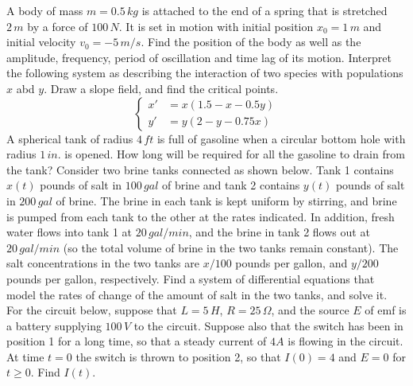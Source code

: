 \documentclass[12pt]{article}
\begin{document}
{\problem[5pts] A body of mass $m=0.5\, kg$ is attached to the end of a spring
that is stretched $2\, m$ by a force of $100\, N$.  It is set in motion with
initial position $x_0=1\, m$ and initial velocity $v_0=-5\, m/s$.  Find the
position of the body as well as the amplitude, frequency, period of oscillation
and time lag of its motion.}
{\problem[5pts] Interpret the following system as describing the interaction of two species with populations $x$ abd $y$.  Draw a slope field, and find the critical points.}
\begin{equation*}
\begin{cases} x' &= x(1.5-x-0.5y) \\ y' &= y(2-y-0.75x) \end{cases}
\end{equation*}
{\problem[5pts] A spherical tank of radius $4\, ft$ is full of gasoline when a circular bottom hole with radius $1\, in.$ is opened.  How long will be required for all the gasoline to drain from the tank?}
{\problem[10pts]\label{p:tanks} Consider two brine tanks connected as shown below.  Tank 1
contains $x(t)$ pounds of salt in $100\, gal$ of brine and tank 2 contains
$y(t)$ pounds of salt in $200\, gal$ of brine.  The brine in each tank is kept
uniform by stirring, and brine is pumped from each tank to the other at the
rates indicated.  In addition, fresh water flows into tank 1 at $20\, gal/min$,
and the brine in tank 2 flows out at $20\, gal/min$ (so the total volume of
brine in the two tanks remain constant).  The salt concentrations in the two
tanks are $x/100$ pounds per gallon, and $y/200$ pounds per gallon,
respectively.  Find a system of differential equations that model the rates of
change of the amount of salt in the two tanks, and solve it.}
{\problem[10pts]\label{p:circuit} For the circuit below, suppose that $L= 5\, H$, $R = 25\, \Omega$, and the source $E$ of emf is a battery supplying $100\, V$ to the circuit.  Suppose also that the switch has been in position 1 for a long time, so that a steady current of $4 A$ is flowing in the circuit.  At time $t=0$ the switch is thrown to position 2, so that $I(0)=4$ and $E=0$ for $t \geq 0$.  Find $I(t)$.}
\end{document}
